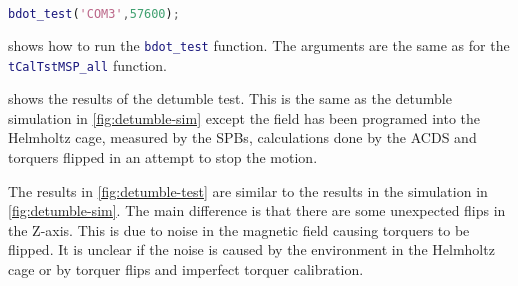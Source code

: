 \begin{lstlisting}[style=code,caption={Testing B-dot},label={lst:MSP-bdot},language=Matlab]
bdot_test('COM3',57600);
\end{lstlisting}

 shows how to run the \lstinline[style=code,language=Matlab]$bdot_test$ function. The arguments are the same as for the \lstinline[style=code,language=Matlab]$tCalTstMSP_all$ function.


 shows the results of the detumble test. This is the same as the detumble simulation in \cref{fig:detumble-sim} except the field has been programed into the Helmholtz cage, measured by the \acp{SPB}, calculations done by the \ac{ACDS} and torquers flipped in an attempt to stop the motion.

The results in \cref{fig:detumble-test} are similar to the results in the simulation in \cref{fig:detumble-sim}. The main difference is that there are some unexpected flips in the Z-axis. This is due to noise in the magnetic field causing torquers to be flipped. It is unclear if the noise is caused by the environment in the Helmholtz cage or by torquer flips and imperfect torquer calibration.


